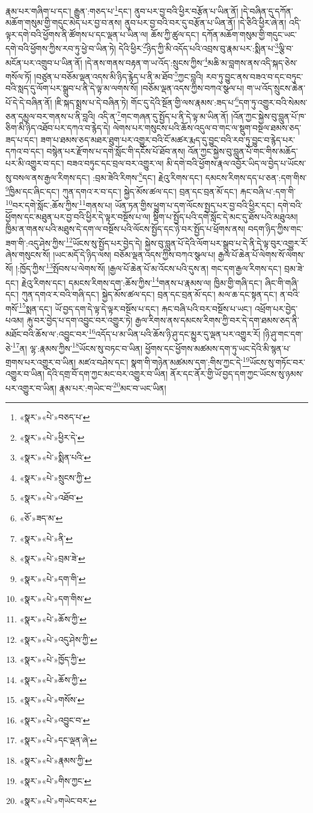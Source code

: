 རྣམ་པར་གཞིག་པ་དང་། རྒྱུན་:གཅད་པ་\footnote{«སྣར་»«པེ་»བཅད་པ་}དང་། ནུབ་པར་བྱ་བའི་ཕྱིར་བརྩོན་པ་ཡིན་ནོ། །དེ་བཞིན་དུ་དཀོན་མཆོག་གསུམ་གྱི་གདུང་མེད་པར་བྱ་བ་ནས། ནུབ་པར་བྱ་བའི་བར་དུ་བརྩོན་པ་ཡིན་ནོ། །དེ་ཅིའི་ཕྱིར་ཞེ་ན། འདི་ལྟར་དགེ་བའི་ཕྱོགས་ནི་ཚོགས་པ་དང་ལྡན་པ་ཡིན་ལ། ཆོས་ཀྱི་ཚུལ་དང་། དཀོན་མཆོག་གསུམ་གྱི་གདུང་ཡང་དགེ་བའི་ཕྱོགས་ཀྱིས་རབ་ཏུ་ཕྱེ་བ་ཡིན་ཏེ། དེའི་ཕྱིར་\footnote{«སྣར་»«པེ་»ཕྱིར་དེ་}ཉིད་ཀྱི་མི་འདོད་པའི་འབྲས་བུ་རྣམ་པར་:སྨིན་པ་\footnote{«སྣར་»«པེ་»སྨིན་པའི་}ལྕི་བ་མངོན་པར་འགྲུབ་པ་ཡིན་ནོ། །དེ་ནས་གནས་བརྟན་ག་ཡ་འོད་:སྲུངས་ཀྱིས་\footnote{«སྣར་»«པེ་»སྲུངས་ཀྱི་}མཆི་མ་བླགས་ནས་འདི་སྐད་ཅེས་གསོལ་ཏོ། །བཙུན་པ་བཅོམ་ལྡན་འདས་མི་ཉིད་རྙེད་པ་ནི་མ་ཐོབ་\footnote{«སྣར་»«པེ་»འཐོབ་}ཀྱང་བླའི། རབ་ཏུ་བྱུང་ནས་བཟའ་བ་དང་བཏུང་བའི་སླད་དུ་ལོག་པར་སྒྲུབ་པ་ནི་དེ་ལྟ་མ་ལགས་སོ། །བཅོམ་ལྡན་འདས་ཀྱིས་བཀའ་སྩལ་པ། ག་ཡ་འོད་སྲུངས་ཆེན་པོ་དེ་དེ་བཞིན་ནོ། །ཇི་སྐད་སྨྲས་པ་དེ་བཞིན་ཏེ། གོང་དུ་དེའི་སྔོན་གྱི་ལས་རྣམས་:ཟད་པ་\footnote{«ཅོ་»ཟད་མ་}དག་ཏུ་འགྱུར་བའི་སེམས་ཅན་དམྱལ་བར་གནས་པ་ནི་བླའི། འདི་ན་\footnote{«སྣར་»«པེ་»ནི་}གང་གཞན་དུ་སྤྱོད་པ་ནི་དེ་ལྟ་མ་ཡིན་ནོ། །འོན་ཀྱང་སྐྱེས་བུ་བླུན་པོ་ཁ་ཅིག་མི་ཉིད་འཐོབ་པར་དཀའ་བ་རྙེད་དེ། ལེགས་པར་གསུངས་པའི་ཆོས་འདུལ་བ་གང་ལ་སྡུག་བསྔལ་ཐམས་ཅད་ཟད་པ་དང་། ཟག་པ་ཐམས་ཅད་མཐར་ཐུག་པར་འགྱུར་བའི་ངོ་མཚར་རྨད་དུ་བྱུང་བའི་རབ་ཏུ་བྱུང་བ་རྙེད་པར་དཀའ་བ་དང་། བསྙེན་པར་རྫོགས་པ་དགེ་སློང་གི་དངོས་པོ་ཐོབ་ནས། འོན་ཀྱང་སྐྱེས་བུ་བླུན་པོ་གང་གིས་མཆོད་པར་མི་འགྱུར་བ་དང་། བཟའ་བཏུང་དང་བྲལ་བར་འགྱུར་ལ། མི་དགེ་བའི་ཕྱོགས་རྣལ་འབྱོར་ཡིད་ལ་བྱེད་པ་ཡོངས་སུ་བསལ་ནས་རྒྱལ་རིགས་དང་། :བྲམ་ཟེའི་རིགས་\footnote{«སྣར་»«པེ་»བྲམ་ཟེ་}དང་། རྗེའུ་རིགས་དང་། དམངས་རིགས་དད་པ་ཅན་:དག་གིས་\footnote{«སྣར་»«པེ་»དག་གི་}ཁྱིམ་དང་ཞིང་དང་། ཀུན་དགའ་ར་བ་དང་། སྐྱེད་མོས་ཚལ་དང་། བྲན་དང་བྲན་མོ་དང་། རྐང་བཞི་པ་:དག་གི་\footnote{«སྣར་»«པེ་»དག་གིས་}བར་དགེ་སློང་:ཆོས་ཀྱིས་\footnote{«སྣར་»«པེ་»ཆོས་ཀྱི་}གནས་པ། ཡོན་ཏན་གྱིས་ཕྱུག་པ་དག་ལོངས་སྤྱད་པར་བྱ་བའི་ཕྱིར་དང་། དགེ་བའི་ཕྱོགས་དང་མཐུན་པར་བྱ་བའི་ཕྱིར་དེ་ལྟར་བསྔོས་པ་ལ། སྡིག་པ་སྤྱོད་པའི་དགེ་སློང་དེ་མང་དུ་ཐོས་པའི་མཐུའམ། ཁྱིམ་ན་གནས་པའི་མཐུས་དེ་དག་ལ་བསྔོས་པའི་ལོངས་སྤྱོད་དང་ཉེ་བར་སྤྱོད་པ་ཕྲོགས་ནས། བདག་ཉིད་ཀྱིས་གང་ཟག་གི་:འདུ་ཤེས་ཀྱིས་\footnote{«སྣར་»«པེ་»འདུ་ཤེས་ཀྱི་}ཡོངས་སུ་སྤྱོད་པར་བྱེད་དེ། སྐྱེས་བུ་བླུན་པོ་དེའི་ལོག་པར་སྒྲུབ་པ་དེ་ནི་དེ་ལྟ་བུར་འགྱུར་རོ་ཞེས་གསུངས་སོ། །ཡང་མདོ་དེ་ཉིད་ལས། བཅོམ་ལྡན་འདས་ཀྱིས་བཀའ་སྩལ་པ། རྒྱལ་པོ་ཆེན་པོ་ལེགས་སོ་ལེགས་སོ། །:ཁྱོད་ཀྱིས་\footnote{«སྣར་»«པེ་»ཁྱོད་ཀྱི་}སྤོབས་པ་ལེགས་སོ། །རྒྱལ་པོ་ཆེན་པོ་མ་འོངས་པའི་དུས་ན། གང་དག་རྒྱལ་རིགས་དང་། བྲམ་ཟེ་དང་། རྗེའུ་རིགས་དང་། དམངས་རིགས་དག་:ཆོས་ཀྱིས་\footnote{«སྣར་»«པེ་»ཆོས་ཀྱི་}གནས་པ་རྣམས་ལ། ཁྱིམ་གྱི་གཞི་དང་། ཞིང་གི་གཞི་དང་། ཀུན་དགའ་ར་བའི་གཞི་དང་། སྐྱེད་མོས་ཚལ་དང་། བྲན་དང་བྲན་མོ་དང་། མལ་ཆ་དང་སྟན་དང་། ན་བའི་གསོ་\footnote{«སྣར་»«པེ་»གསོས་}སྨན་དང་། ཡོ་བྱད་དག་དེ་ལྟ་དེ་ལྟར་བསྔོས་པ་དང་། རྐང་བཞི་པའི་བར་བསྔོས་པ་ཡང་། འཕྲོག་པར་བྱེད་པའམ། རྐུ་བར་བྱེད་པ་དག་འབྱུང་བར་འགྱུར་ཏེ། རྒྱལ་རིགས་ནས་དམངས་རིགས་ཀྱི་བར་དེ་དག་ཐམས་ཅད་ནི་མཐོང་བའི་ཆོས་ལ་:འབྱུང་བར་\footnote{«སྣར་»«པེ་»འབྱུང་བ་}འདོད་པ་མ་ཡིན་པའི་ཆོས་ཉི་ཤུ་དང་མྱུར་དུ་ལྡན་པར་འགྱུར་རོ། །ཉི་ཤུ་གང་དག་ཅེ་\footnote{«སྣར་»«པེ་»དང་ལྡན་ཞེ་}ན། ལྷ་:རྣམས་ཀྱིས་\footnote{«སྣར་»«པེ་»རྣམས་ཀྱི་}ཡོངས་སུ་བཏང་བ་ཡིན། ཕྱོགས་དང་ཕྱོགས་མཚམས་དག་ཏུ་ཡང་དེའི་མི་སྙན་པ་གྲགས་པར་འགྱུར་བ་ཡིན། མཛའ་བཤེས་དང་། སྣག་གི་གཉེན་མཚམས་དག་:གིས་ཀྱང་དེ་\footnote{«སྣར་»«པེ་»གིས་ཀྱང་}ཡོངས་སུ་གཏོང་བར་འགྱུར་བ་ཡིན། དེའི་དགྲ་བོ་དག་ཀྱང་མང་བར་འགྱུར་བ་ཡིན། ནོར་དང་ནོར་གྱི་ཡོ་བྱད་དག་ཀྱང་ཡོངས་སུ་ཉམས་པར་འགྱུར་བ་ཡིན། རྣམ་པར་:གཡེང་བ་\footnote{«སྣར་»«པེ་»གཡེང་བར་}མང་བ་ཡང་ཡིན། 